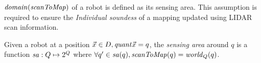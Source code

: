 $\mathit{domain}(\mathit{scanToMap})$ of a robot is defined as its sensing area. This assumption is required to ensure the \emph{Individual soundess} of a mapping updated using LIDAR scan information.





\begin{definition}
   Given a robot at a position $\Vec{x}\in D, \mathit{quant}{\Vec{x}} = q$, the \emph{sensing area} around $q$ is a function $\mathit{sa}: Q \mapsto 2^{Q}$ where $\forall q^\prime \in \mathit{sa}(q), \mathit{scanToMap}(q) = \mathit{world}_Q(q)$.
\end{definition}





